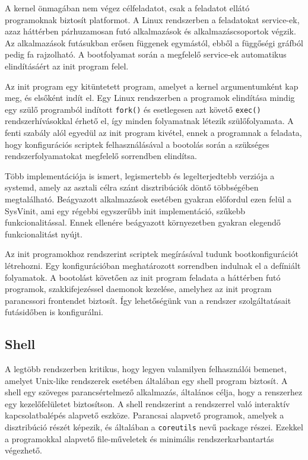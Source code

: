 A kernel önmagában nem végez célfeladatot, csak a feladatot ellátó programoknak
biztosít platformot. A Linux rendszerben a feladatokat service-ek, azaz háttérben
párhuzamosan futó alkalmazások és alkalmazáscsoportok végzik. Az alkalmazások
futásukban erősen függenek egymástól, ebből a függőségi gráfból pedig fa
rajzolható. A bootfolyamat során a megfelelő service-ek automatikus elindításáért
az init program felel.

\medskip

Az init program egy kitüntetett program, amelyet a kernel argumentumként kap meg,
és elsőként indít el. Egy Linux rendszerben a programok elindítása mindig egy
szülő programból indított \verb|fork()| és esetlegesen azt követő \verb|exec()|
rendszerhívásokkal érhető el, így minden folyamatnak létezik szülőfolyamata. A
fenti szabály alól egyedül az init program kivétel, ennek a programnak a
feladata, hogy konfigurációs scriptek felhasználásával a bootolás során a
szükséges rendszerfolyamatokat megfelelő sorrendben elindítsa.

Több implementációja is ismert, legismertebb és legelterjedtebb verziója a
systemd, amely az asztali célra szánt disztribúciók döntő többségében
megtalálható. Beágyazott alkalmazások esetében gyakran előfordul ezen felül a
SysVinit, ami egy régebbi egyszerűbb init implementáció, szűkebb
funkcionalitással. Ennek ellenére beágyazott környezetben gyakran elegendő
funkcionalitást nyújt.

Az init programokhoz rendszerint scriptek megírásával tudunk bootkonfigurációt
létrehozni. Egy konfigurációban meghatározott sorrendben indulnak el a defíniált
folyamatok. A bootolást követően az init program feladata a háttérben futó
programok, szakkifejezéssel daemonok kezelése, amelyhez az init program
parancssori frontendet biztosít. Így lehetőségünk van a rendszer szolgáltatásait
futásidőben is konfigurálni.

\subsection{Shell}

A legtöbb rendszerben kritikus, hogy legyen valamilyen felhasználói bemenet,
amelyet Unix-like rendszerek esetében általában egy shell program biztosít. A
shell egy szöveges parancsértelmező alkalmazás, általános célja, hogy a
renszerhez egy kezelőfelületet biztosítson. A shell rendszerint a rendszerrel
való interaktív kapcsolatbalépés alapvető eszköze. Parancsai alapvető programok,
amelyek a disztribúció részét képezik, és általában a \verb|coreutils| nevű
package részei. Ezekkel a programokkal alapvető file-műveletek és minimális
rendszerkarbantartás végezhető.

